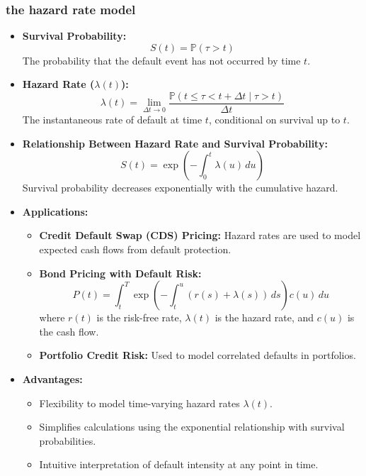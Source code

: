 \subsubsection{the hazard rate model}
\begin{itemize}
    \item \textbf{Survival Probability:}
    \[
    S(t) = \mathbb{P}(\tau > t)
    \]
    The probability that the default event has not occurred by time \(t\).

    \item \textbf{Hazard Rate (\(\lambda(t)\)):}
    \[
    \lambda(t) = \lim_{\Delta t \to 0} \frac{\mathbb{P}(t \leq \tau < t + \Delta t \mid \tau > t)}{\Delta t}
    \]
    The instantaneous rate of default at time \(t\), conditional on survival up to \(t\).

    \item \textbf{Relationship Between Hazard Rate and Survival Probability:}
    \[
    S(t) = \exp\left(-\int_0^t \lambda(u) \, du\right)
    \]
    Survival probability decreases exponentially with the cumulative hazard.

    \item \textbf{Applications:}
    \begin{itemize}
        \item \textbf{Credit Default Swap (CDS) Pricing:} Hazard rates are used to model expected cash flows from default protection.
        \item \textbf{Bond Pricing with Default Risk:}
        \[
        P(t) = \int_t^T \exp\left(-\int_t^u (r(s) + \lambda(s)) \, ds\right) c(u) \, du
        \]
        where \(r(t)\) is the risk-free rate, \(\lambda(t)\) is the hazard rate, and \(c(u)\) is the cash flow.
        \item \textbf{Portfolio Credit Risk:} Used to model correlated defaults in portfolios.
    \end{itemize}

    \item \textbf{Advantages:}
    \begin{itemize}
        \item Flexibility to model time-varying hazard rates \(\lambda(t)\).
        \item Simplifies calculations using the exponential relationship with survival probabilities.
        \item Intuitive interpretation of default intensity at any point in time.
    \end{itemize}


\end{itemize}
